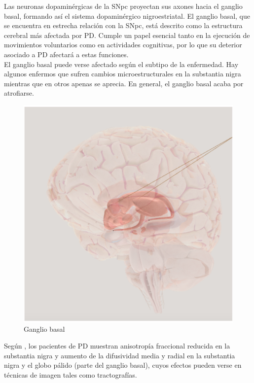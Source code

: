 Las neuronas dopaminérgicas de la SNpc proyectan sus axones hacia el ganglio basal, formando así el sistema dopaminérgico nigroestriatal. El ganglio basal, que se encuentra en estrecha relación con la SNpc, está descrito como la estructura cerebral más afectada por PD. Cumple un papel esencial tanto en la ejecución de movimientos voluntarios como en actividades cognitivas, por lo que su deterior asociado a PD afectará a estas funciones. \\

El ganglio basal puede verse afectado según el subtipo de la enfermedad. Hay algunos enfermos que sufren cambios microestructurales en la substantia nigra mientras que en otros apenas se aprecia. En general, el ganglio basal acaba por atrofiarse. 

\begin{figure}[H] %
	\centering
	\includegraphics[scale=0.6]{gb.png}  %
	\caption{Ganglio basal} 
	\label{fig:gb}
\end{figure}

Según \cite{wp}, los pacientes de PD muestran anisotropía fraccional reducida en la substantia nigra y aumento de la difusividad media y radial en la substantia nigra y el globo pálido (parte del ganglio basal), cuyos efectos pueden verse en técnicas de imagen tales como tractografías.

